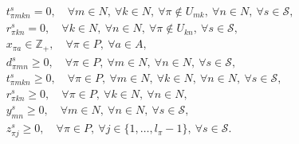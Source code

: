 \begin{subequations}
\begin{align}
	&t_{\pi m k n}^s = 0,\quad\forall m\in N,\ \forall k\in N,\ \forall \pi\notin U_{mk},\ \forall n\in N,\ \forall s\in\mathcal{S},\label{cargo:l}\\
	&r_{\pi k n}^s = 0,\quad\forall k\in N,\ \forall n\in N,\ \forall \pi\notin U_{kn},\ \forall s\in\mathcal{S},\label{cargo:m}\\
	&x_{\pi a}\in\mathbb{Z}_+,\quad\forall \pi\in P,\ \forall a\in A,\label{cargo:n}\\
	&d_{\pi m n}^s\ge 0,\quad\forall \pi\in P,\ \forall m\in N,\ \forall n\in N,\ \forall s\in\mathcal{S},\label{cargo:o}\\
	&t_{\pi mkn}^s\ge 0,\quad\forall \pi\in P,\ \forall m\in N,\ \forall k\in N,\ \forall n\in N,\ \forall s\in\mathcal{S},\label{cargo:p}\\
	&r_{\pi kn}^s\ge 0,\quad\forall \pi\in P,\ \forall k\in N,\ \forall n\in N,\label{cargo:q}\\
	&y_{mn}^s\ge 0,\quad\forall m\in N,\ \forall n\in N,\ \forall s\in\mathcal{S},\label{cargo:r}\\
	&z_{\pi j}^s\ge 0,\quad\forall\pi\in P,\ \forall j\in \{1,\ldots,l_\pi-1\},\ \forall s\in\mathcal{S}.\label{cargo:s}
	\end{align}
\end{subequations}

